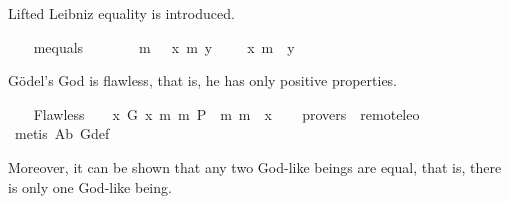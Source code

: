 %
\begin{isabellebody}%
\def\isabellecontext{GoedelGodExtensions}%
%
\isadelimtheory
%
\endisadelimtheory
%
\isatagtheory
%
\endisatagtheory
{\isafoldtheory}%
%
\isadelimtheory
%
\endisadelimtheory
%
\isamarkuptrue%
%
\begin{isamarkuptext}%
Lifted Leibniz equality is introduced.%
\end{isamarkuptext}%
\isamarkuptrue%
\ \ \isamarkupfalse%
\ mequals\ {\isacharcolon}{\isacharcolon}\ {\isachardoublequoteopen}{\isasymmu}\ {\isasymRightarrow}\ {\isasymmu}\ {\isasymRightarrow}\ {\isasymsigma}{\isachardoublequoteclose}\ {\isacharparenleft}\ {\isachardoublequoteopen}m{\isacharequal}{\isachardoublequoteclose}\ {}{}{\isacharparenright}\ \ {\isachardoublequoteopen}x\ m{\isacharequal}\ y\ {\isasymequiv}\ {\isasymPi}\ {\isacharparenleft}{\isasymlambda}\ {\isasymphi}{\isachardot}{\isacharparenleft}{\isasymphi}\ x\ m{\isasymRightarrow}\ {\isasymphi}\ y{\isacharparenright}{\isacharparenright}{\isachardoublequoteclose}%
\begin{isamarkuptext}%
G\"odel's God is flawless, that is, he has only positive properties.%
\end{isamarkuptext}%
\isamarkuptrue%
\ \ \isamarkupfalse%
\ Flawless{\isacharcolon}\ {\isachardoublequoteopen}{\isacharbrackleft}{\isasymPi}\ {\isacharparenleft}{\isasymlambda}{\isasymphi}{\isachardot}\ {\isasymforall}\ {\isacharparenleft}{\isasymlambda}x{\isachardot}\ {\isacharparenleft}G\ x\ m{\isasymRightarrow}\ {\isacharparenleft}m{\isasymnot}\ {\isacharparenleft}P\ {\isasymphi}{\isacharparenright}\ m{\isasymRightarrow}\ m{\isasymnot}\ {\isacharparenleft}{\isasymphi}\ x{\isacharparenright}{\isacharparenright}{\isacharparenright}{\isacharparenright}{\isacharparenright}{\isacharbrackright}{\isachardoublequoteclose}\isanewline
\ \ \isamarkupfalse%
\ {\isacharbrackleft}provers\ {\isacharequal}\ remote{\isacharunderscore}leo{}{\isacharbrackright}%
\isadelimproof
\ %
\endisadelimproof
%
\isatagproof
{}\isamarkupfalse%
\ {\isacharparenleft}metis\ A{}b\ G{\isacharunderscore}def{\isacharparenright}%
\endisatagproof
{\isafoldproof}%
%
\isadelimproof
%
\endisadelimproof
%
\begin{isamarkuptext}%
Moreover, it can be shown that any two God-like beings are equal, that is, 
there is only one God-like being.%
\end{isamarkuptext}%

\end{isabellebody}
